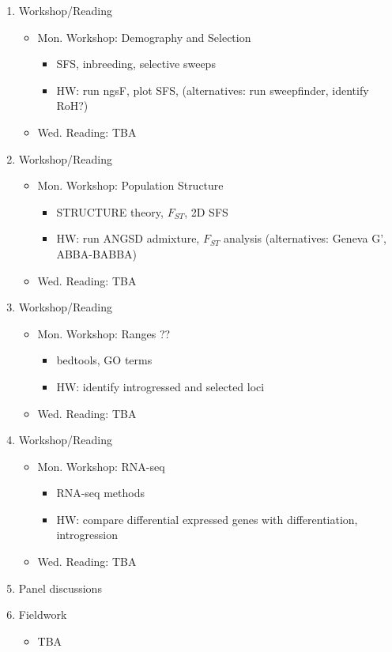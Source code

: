 \documentclass[]{article}
\begin{document}
\begin{enumerate}
\item Workshop/Reading
	\begin{itemize}
	\item Mon. Workshop: Demography and Selection
		\begin{itemize}
		\item SFS, inbreeding, selective sweeps
		\item HW: run ngsF, plot SFS, (alternatives: run sweepfinder, identify RoH?)
		\end{itemize}
	\item Wed. Reading: TBA
\end{itemize}

\item Workshop/Reading
	\begin{itemize}
	\item Mon. Workshop: Population Structure
		\begin{itemize}
		\item STRUCTURE theory, $F_{ST}$, 2D SFS
		\item HW: run ANGSD admixture, $F_{ST}$ analysis (alternatives: Geneva G', ABBA-BABBA)
		\end{itemize}
	\item Wed. Reading: TBA
\end{itemize}

\item Workshop/Reading
	\begin{itemize}
	\item Mon. Workshop: Ranges ??
		\begin{itemize}
		\item bedtools, GO terms
		\item HW: identify introgressed and selected loci
		\end{itemize}
	\item Wed. Reading: TBA
\end{itemize}

\item Workshop/Reading
	\begin{itemize}
	\item Mon. Workshop: RNA-seq
		\begin{itemize}
		\item RNA-seq methods
		\item HW: compare differential expressed genes with differentiation, introgression
		\end{itemize}
	\item Wed. Reading: TBA
\end{itemize}

\item Panel discussions

\item Fieldwork
\begin{itemize}
\item TBA
\end{itemize}


\end{enumerate}
\end{document}
